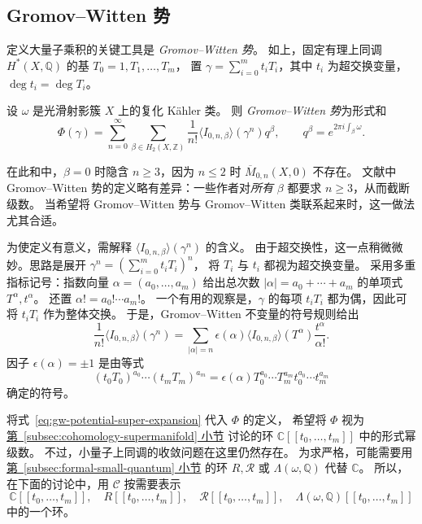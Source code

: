 \subsection{Gromov--Witten 势}\label{subsec:gw-potential}
定义大量子乘积的关键工具是 \emph{Gromov--Witten 势}。
如上，固定有理上同调 $H^*(X,\mathbb Q)$ 的基 $T_0=1,T_1,\ldots,T_m$，
置 $\gamma=\sum_{i=0}^mt_iT_i$，其中 $t_i$ 为超交换变量，$\deg t_i=\deg T_i$。
\begin{definition}\label{def:gw-potential}
设 $\omega$ 是光滑射影簇 $X$ 上的复化 Kähler 类。
则 \emph{Gromov--Witten 势}为形式和
\[
\Phi(\gamma)=\sum_{n=0}^{\infty}\sum_{\beta\in H_2(X,\mathbb Z)}
\frac1{n!}\langle I_{0,n,\beta}\rangle(\gamma^n)q^\beta,
\qquad q^\beta=e^{2\pi i\int_\beta\omega}.
\]
\end{definition}
在此和中，$\beta=0$ 时隐含 $n\geq3$，因为 $n\leq2$ 时 $\overline M_{0,n}(X,0)$ 不存在。
文献中 Gromov--Witten 势的定义略有差异：一些作者对\emph{所有} $\beta$ 都要求 $n\geq3$，从而截断级数。
当希望将 Gromov--Witten 势与 Gromov--Witten 类联系起来时，这一做法尤其合适。

为使定义有意义，需解释 $\langle I_{0,n,\beta}\rangle(\gamma^n)$ 的含义。
由于超交换性，这一点稍微微妙。思路是展开 $\gamma^n=(\sum_{i=0}^mt_iT_i)^n$，
将 $T_i$ 与 $t_i$ 都视为超交换变量。
采用多重指标记号：指数向量 $\alpha=(a_0,\ldots,a_m)$ 给出总次数
$|\alpha|=a_0+\cdots+a_m$ 的单项式 $T^\alpha,t^\alpha$。
还置 $\alpha!=a_0!\cdots a_m!$。
一个有用的观察是，$\gamma$ 的每项 $t_iT_i$ 都为偶，因此可将 $t_iT_i$ 作为整体交换。
于是，Gromov--Witten 不变量的符号规则给出
\begin{equation}\label{eq:gw-potential-super-expansion}
\frac1{n!}\langle I_{0,n,\beta}\rangle(\gamma^n)
=\sum_{|\alpha|=n}\epsilon(\alpha)\langle I_{0,n,\beta}\rangle(T^\alpha)\frac{t^\alpha}{\alpha!}.
\end{equation}
因子 $\epsilon(\alpha)=\pm1$ 是由等式
\begin{equation}\label{eq:gw-potential-super-sign}
(t_0T_0)^{a_0}\cdots(t_mT_m)^{a_m}
=\epsilon(\alpha)T_0^{a_0}\cdots T_m^{a_m}t_0^{a_0}\cdots t_m^{a_m}
\end{equation}
确定的符号。

将式~\eqref{eq:gw-potential-super-expansion} 代入 $\Phi$ 的定义，
希望将 $\Phi$ 视为\hyperref[subsec:cohomology-supermanifold]{第~\ref*{subsec:cohomology-supermanifold} 小节}
讨论的环 $\mathbb C[[t_0,\ldots,t_m]]$ 中的形式幂级数。
不过，小量子上同调的收敛问题在这里仍然存在。
为求严格，可能需要用\hyperref[subsec:formal-small-quantum]{第~\ref*{subsec:formal-small-quantum} 小节}
的环 $R,\mathcal R$ 或 $\Lambda(\omega,\mathbb Q)$ 代替 $\mathbb C$。
所以，在下面的讨论中，用 $\mathcal C$ 按需要表示
\[
\mathbb C[[t_0,\ldots,t_m]],\quad R[[t_0,\ldots,t_m]],\quad
\mathcal R[[t_0,\ldots,t_m]],\quad\Lambda(\omega,\mathbb Q)[[t_0,\ldots,t_m]]
\]
中的一个环。

